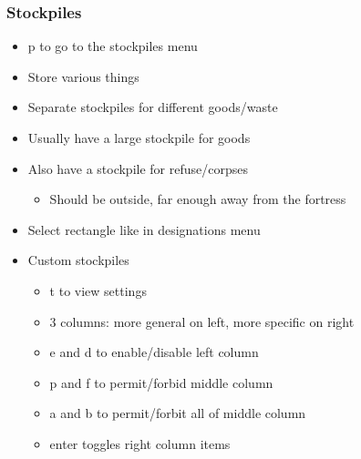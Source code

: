 \begin{frame}
\frametitle{Stockpiles}
\begin{itemize}
\item p to go to the stockpiles menu
\item Store various things
\item Separate stockpiles for different goods/waste
\item Usually have a large stockpile for goods
\item Also have a stockpile for refuse/corpses
\begin{itemize}
	\item Should be outside, far enough away from the fortress
\end{itemize}
\item Select rectangle like in designations menu
\item Custom stockpiles
\begin{itemize}
	\item t to view settings
	\item 3 columns: more general on left, more specific on right
	\item e and d to enable/disable left column
	\item p and f to permit/forbid middle column
	\item a and b to permit/forbit all of middle column
	\item enter toggles right column items
\end{itemize}
\end{itemize}
\end{frame}
